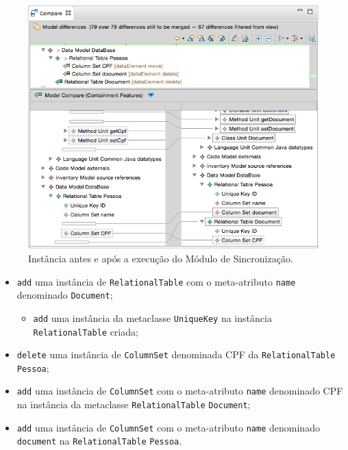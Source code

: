 \begin{figure}[!h]
	\centering
	\caption{Instância antes e após a execução do Módulo de Sincronização.}
	\label{fig:efeitoPropagacaoKDMSINC}
	\includegraphics[scale=0.6]{images/propagacaoKDMEfeito}
	\fautor
\end{figure}

\begin{itemize}
    \item \texttt{add} uma instância de \texttt{RelationalTable} com o meta-atributo \texttt{name} denominado \texttt{Document};
    
    \begin{itemize}
        \item \texttt{add} uma instância da metaclasse \texttt{UniqueKey} na instância \texttt{RelationalTable} criada;
    \end{itemize}
    
    \item \texttt{delete} uma instância de \texttt{ColumnSet} denominada CPF da \texttt{RelationalTable} \texttt{Pessoa};
    
    \item \texttt{add} uma instância de \texttt{ColumnSet} com o meta-atributo \texttt{name} denominado CPF na instância da metaclasse \texttt{RelationalTable} \texttt{Document};
    
    \item \texttt{add} uma instância de \texttt{ColumnSet} com o meta-atributo \texttt{name} denominado \texttt{document} na \texttt{RelationalTable} \texttt{Pessoa}.

    
\end{itemize}

